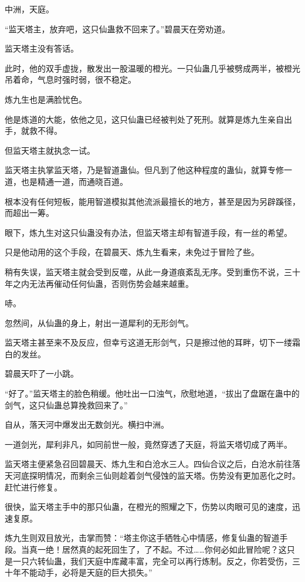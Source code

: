 
\begin{this_body}

中洲，天庭。

“监天塔主，放弃吧，这只仙蛊救不回来了。”碧晨天在旁劝道。

监天塔主没有答话。

此时，他的双手虚拢，散发出一股温暖的橙光。一只仙蛊几乎被劈成两半，被橙光吊着命，气息时强时弱，很不稳定。

炼九生也是满脸忧色。

他是炼道的大能，依他之见，这只仙蛊已经被判处了死刑。就算是炼九生亲自出手，就救不得。

但监天塔主就执念一试。

监天塔主执掌监天塔，乃是智道蛊仙。但凡到了他这种程度的蛊仙，就算专修一道，也是精通一道，而通晓百道。

根本没有任何短板，能用智道模拟其他流派最擅长的地方，甚至是因为另辟蹊径，而超出一筹。

眼下，炼九生对这只仙蛊没有办法，但监天塔主却有智道手段，有一丝的希望。

只是他动用的这个手段，在碧晨天、炼九生看来，未免过于冒险了些。

稍有失误，监天塔主就会受到反噬，从此一身道痕紊乱无序。受到重伤不说，三十年之内无法再催动任何仙蛊，否则伤势会越来越重。

哧。

忽然间，从仙蛊的身上，射出一道犀利的无形剑气。

监天塔主甚至来不及反应，但幸亏这道无形剑气，只是擦过他的耳畔，切下一缕霜白的发丝。

碧晨天吓了一小跳。

“好了。”监天塔主的脸色稍缓。他吐出一口浊气，欣慰地道，“拔出了盘踞在蛊中的剑气，这只仙蛊总算挽救回来了。”

自从，落天河中爆发出无数剑光。横扫中洲。

一道剑光，犀利非凡，如同前世一般，竟然穿透了天庭，将监天塔切成了两半。

监天塔主便紧急召回碧晨天、炼九生和白沧水三人。四仙合议之后，白沧水前往落天河底探明情况，而剩余三仙则趁着剑气侵蚀的监天塔。伤势没有更加恶化之时。赶忙进行修复。

很快，监天塔主手中的那只仙蛊，在橙光的照耀之下，伤势以肉眼可见的速度，迅速复原。

炼九生则双目放光，击掌而赞：“塔主你这手牺牲心中情感，修复仙蛊的智道手段。当真一绝！居然真的起死回生了，了不起。不过……你何必如此冒险呢？这只是一只六转仙蛊，我们天庭中库藏丰富，完全可以再行炼制。反之，你若受伤，三十年不能动手，必将是天庭的巨大损失。”


\end{this_body}
